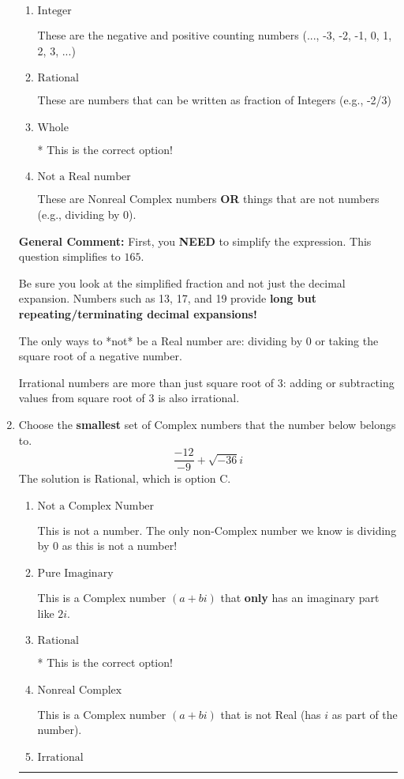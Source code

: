 \documentclass{extbook}[14pt]
\newcommand{\litem}[1]{\item #1

\rule{\textwidth}{0.4pt}}
\begin{document}
\begin{enumerate}
{\begin{enumerate}[label=\Alph*.]
These cannot be written as a fraction of Integers.
\item \( \text{Integer} \)

These are the negative and positive counting numbers (..., -3, -2, -1, 0, 1, 2, 3, ...)
\item \( \text{Rational} \)

These are numbers that can be written as fraction of Integers (e.g., -2/3)
\item \( \text{Whole} \)

* This is the correct option!
\item \( \text{Not a Real number} \)

These are Nonreal Complex numbers \textbf{OR} things that are not numbers (e.g., dividing by 0).
\end{enumerate}

\textbf{General Comment:} First, you \textbf{NEED} to simplify the expression. This question simplifies to $165$. 
 
 Be sure you look at the simplified fraction and not just the decimal expansion. Numbers such as 13, 17, and 19 provide \textbf{long but repeating/terminating decimal expansions!} 
 
 The only ways to *not* be a Real number are: dividing by 0 or taking the square root of a negative number. 
 
 Irrational numbers are more than just square root of 3: adding or subtracting values from square root of 3 is also irrational.
}
\litem{
Choose the \textbf{smallest} set of Complex numbers that the number below belongs to.
\[ \frac{-12}{-9}+\sqrt{-36}i \]
The solution is \( \text{Rational} \), which is option C.\begin{enumerate}[label=\Alph*.]
\item \( \text{Not a Complex Number} \)

This is not a number. The only non-Complex number we know is dividing by 0 as this is not a number!
\item \( \text{Pure Imaginary} \)

This is a Complex number $(a+bi)$ that \textbf{only} has an imaginary part like $2i$.
\item \( \text{Rational} \)

* This is the correct option!
\item \( \text{Nonreal Complex} \)

This is a Complex number $(a+bi)$ that is not Real (has $i$ as part of the number).
\item \( \text{Irrational} \)


\end{enumerate}}
\end{enumerate}
\end{document}
